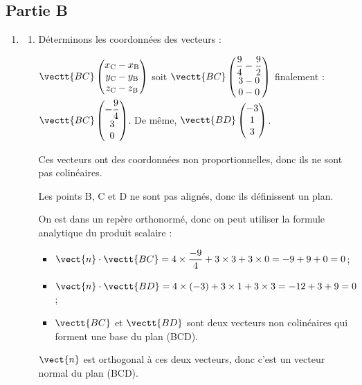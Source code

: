 \subsection*{Partie B}
\begin{enumerate}
 \item 
	\begin{enumerate}
		\item 
		Déterminons les coordonnées des vecteurs :
		
		$\vectt{BC} \begin{pmatrix}
			x_{\mathrm{C}} - x_{\mathrm{B}}\\
			y_{\mathrm{C}} - y_{\mathrm{B}}\\
			z_{\mathrm{C}} - z_{\mathrm{B}} \end{pmatrix} $
		\quad soit \quad $\vectt{BC} \begin{pmatrix}\dfrac{9}{4} - \dfrac{9}{2} \\3-0\\0-0 \end{pmatrix} $
		\quad finalement :\quad $\vectt{BC} \begin{pmatrix} -\dfrac{9}{4}\\3\\0\end{pmatrix} $.
		\quad De même, \quad $\vectt{BD} \begin{pmatrix}  -3\\1\\3 \end{pmatrix} $.
		
		Ces vecteurs ont des coordonnées non proportionnelles, donc ils ne sont pas colinéaires.
		
		Les points B, C et D ne sont pas alignés, donc ils définissent un plan.
		
		On est dans un repère orthonormé, donc on peut utiliser la formule analytique du produit scalaire :
		
		\begin{itemize}
			\item $\vect{n} \cdot \vectt{BC} = 4 \times \dfrac{-9}{4} + 3 \times  3 + 3  \times  0 = -9 + 9 +0 = 0$;
			\item $\vect{n} \cdot \vectt{BD} = 4 \times (-3) +3 \times  1 + 3  \times  3 = -12 + 3 + 9 = 0$;
			\item $\vectt{BC}$ et $\vectt{BD}$ sont deux vecteurs non colinéaires qui forment une base du plan (BCD).
				\end{itemize}
			$\vect{n}$ est orthogonal à ces deux vecteurs, donc c'est un vecteur normal du plan (BCD).
			

\end{enumerate}
\end{enumerate}
